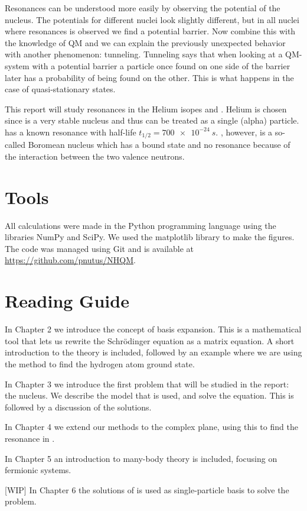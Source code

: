 Resonances can be understood more easily by observing the potential of the nucleus.
The potentials for different nuclei look slightly different, but in all nuclei where resonances is observed we find a potential barrier.
Now combine this with the knowledge of QM and we can explain the previously unexpected behavior with another phenomenon: tunneling.
Tunneling says that when looking at a QM-system with a potential barrier a particle once found on one side of the barrier later has a probability of being found on the other.
This is what happens in the case of quasi-stationary states.

This report will study resonances in the Helium isopes  and .
Helium is chosen since  is a very stable nucleus and thus can be treated as a single (alpha) particle.
 has a known resonance with half-life $t_{1/2} = \SI{700e-24}{s}$. 
, however, is a so-called Boromean nucleus which has a bound state and no resonance because of the interaction between the two valence neutrons.



\section{Tools}

All calculations were made in the Python programming language using the libraries NumPy and SciPy. We used the matplotlib library to make the figures. The code was managed using Git and is available at \url{https://github.com/pnutus/NHQM}.


\section{Reading Guide}
In Chapter 2 we introduce the concept of basis expansion. 
This is a mathematical tool that lets us rewrite the Schrödinger equation as a matrix equation.
A short introduction to the theory is included, followed by an example where we are using the method to find the hydrogen atom ground state.

In Chapter 3 we introduce the first problem that will be studied in the report: the  nucleus. We describe the model that is used, and solve the equation. 
This is followed by a discussion of the solutions.

In Chapter 4 we extend our methods to the complex plane, using this to find the resonance in .

In Chapter 5 an introduction to many-body theory is included, focusing on fermionic systems.  

[WIP] In Chapter 6 the solutions of  is used as single-particle basis to solve the  problem. 
